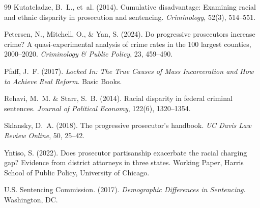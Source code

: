 \documentclass[12pt]{article}
\begin{document}
\begin{thebibliography}{99}
Kutateladze, B.~L., et~al. (2014).
\newblock Cumulative disadvantage: Examining racial and ethnic disparity in prosecution and sentencing.
\newblock \textit{Criminology}, 52(3), 514--551.

Petersen, N., Mitchell, O., \& Yan, S. (2024).
\newblock Do progressive prosecutors increase crime? A quasi-experimental analysis of crime rates in the 100 largest counties, 2000--2020.
\newblock \textit{Criminology \& Public Policy}, 23, 459--490.

Pfaff, J.~F. (2017).
\newblock \textit{Locked In: The True Causes of Mass Incarceration and How to Achieve Real Reform}.
\newblock Basic Books.

Rehavi, M.~M. \& Starr, S.~B. (2014).
\newblock Racial disparity in federal criminal sentences.
\newblock \textit{Journal of Political Economy}, 122(6), 1320--1354.

Sklansky, D.~A. (2018).
\newblock The progressive prosecutor's handbook.
\newblock \textit{UC Davis Law Review Online}, 50, 25--42.

Yntiso, S. (2022).
\newblock Does prosecutor partisanship exacerbate the racial charging gap? Evidence from district attorneys in three states.
\newblock Working Paper, Harris School of Public Policy, University of Chicago.

U.S. Sentencing Commission. (2017).
\newblock \textit{Demographic Differences in Sentencing}.
\newblock Washington, DC.

\end{thebibliography}
\end{document}
